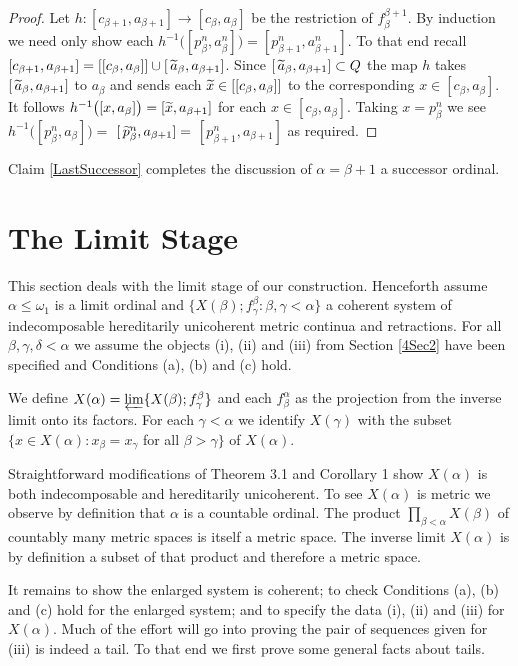 \documentclass[12pt]{article}
\theoremstyle{plain}
\theoremstyle{definition}
\newcommand{\A}{\ensuremath{\alpha}}
\newcommand{\B}{\ensuremath{\beta}}
\newcommand{\W}{\ensuremath{\omega}}
\newcommand{\G}{\ensuremath{\gamma}}
\newcommand{\D}{\ensuremath{\delta}}
\newcommand{\NN}{\ensuremath{\mathbb N}}
\newcommand{\0}{\ensuremath{\varnothing}}
\newcommand{\tl}{\ensuremath{\widetilde}}
\newcommand{\wt}{\ensuremath{\widetilde}}
\begin{document}
	
	\begin{proof}
		Let $h: [c_{\B+1},a_{\B+1}] \to [c_{\B},a_{\B}]$ be the restriction of $f^{\B+1}_\B$. By induction we need only show each $h^{-1} \big ([p^n_{\B}, a^n_{\B}] \big ) = [p^n_{\B+1}, a^n_{\B+1}]$.
		To that end recall $[c_{\B+1}, a_{\B+1}] = [[c_{\B}, a_{\B} ]] \cup [ \, \wt a_{\B}, a_{\B+1}]$.
		Since $[ \, \wt a_{\B}, a_{\B+1}] \subset Q$ the map $h$ takes $[ \, \wt a_{\B}, a_{\B+1}]$ to $a_\B$ and sends each 
		$\tl x \in [[c_{\B},a_{\B}]]$ to the corresponding $x \in [c_{\B},a_{\B}]$.
		It follows $h^{-1}\big ( [ x, a_\B] \big ) = [\wt x, a_{\B+1}]$ for each $x \in [c_{\B},a_{\B}]$.
		Taking $x = p^n_\B$ we see $h^{-1}\big ( [ p^n_\B, a_\B] \big ) = $ $[\,\wt p^n_\B, a_{\B+1}] = $ $[ p^n_{\B+1}, a_{\B+1}]$ as required.
	\end{proof}
	
	Claim \ref{LastSuccessor} completes the discussion of $\A = \B+1$ a successor ordinal.
	
	
	\section{The Limit Stage}\label{4Sec3}
	
	\noindent
	This section deals with the limit stage of our construction. Henceforth assume $\A \le \W_1$ is a limit ordinal and \mbox{$\{X(\B); f^\B_\G : \B,\G< \A\}$} a coherent system of indecomposable hereditarily unicoherent metric continua and retractions. For all $\B,\G,\D < \A$ we assume the objects (i), (ii) and (iii) from Section \ref{4Sec2} have been specified and Conditions (a), (b) and (c) hold.
	
	We define  $X(\A) = \varprojlim \{X(\B); f^\B_\G\}$ and each $f^\A_\B$ as the projection from the inverse limit onto its factors. For each $\G<\A$ we identify  $X(\G)$ with the subset $\big \{x\in X(\A): x_\B = x_\G$ for all $\B > \G \big \}$ of $X(\A)$. 
	
	Straightforward modifications of \cite{IndecomposableLimit} Theorem 3.1 and \cite{HULimits} Corollary 1
	show $X(\A)$ is both indecomposable and hereditarily unicoherent. To see $X(\A)$ is metric we observe by definition that $\A$ is a countable ordinal. %
	The product $\prod_{\B < \A} X(\B)$ of countably many metric spaces is itself a metric space. The inverse limit $X(\A)$ is by definition a subset of that product and therefore a metric space.
	
	It remains to show the enlarged system is coherent; to check Conditions (a), (b) and (c) hold for the enlarged system; and to specify the data (i), (ii) and (iii) for $X(\A)$. Much of the effort will go into proving the pair of sequences given for (iii) is indeed a tail. To that end we first prove some general facts about tails. 
	
\end{document}

